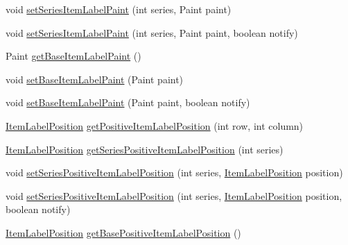 \begin{DoxyCompactItemize}
void \mbox{\hyperlink{classorg_1_1jfree_1_1chart_1_1renderer_1_1_abstract_renderer_a62672ca3063e22a4082f430571606ff0}{set\+Series\+Item\+Label\+Paint}} (int series, Paint paint)
\item 
void \mbox{\hyperlink{classorg_1_1jfree_1_1chart_1_1renderer_1_1_abstract_renderer_ab16a17533a8e7562ecfb1229c3191536}{set\+Series\+Item\+Label\+Paint}} (int series, Paint paint, boolean notify)
\item 
Paint \mbox{\hyperlink{classorg_1_1jfree_1_1chart_1_1renderer_1_1_abstract_renderer_a553eba1baf9f5d241c06a77c80a223d6}{get\+Base\+Item\+Label\+Paint}} ()
\item 
void \mbox{\hyperlink{classorg_1_1jfree_1_1chart_1_1renderer_1_1_abstract_renderer_a7f9efd901126d27a6f785a53e6872e04}{set\+Base\+Item\+Label\+Paint}} (Paint paint)
\item 
void \mbox{\hyperlink{classorg_1_1jfree_1_1chart_1_1renderer_1_1_abstract_renderer_a4d1aac1ee560b81daea409e8a28a4038}{set\+Base\+Item\+Label\+Paint}} (Paint paint, boolean notify)
\item 
\mbox{\hyperlink{classorg_1_1jfree_1_1chart_1_1labels_1_1_item_label_position}{Item\+Label\+Position}} \mbox{\hyperlink{classorg_1_1jfree_1_1chart_1_1renderer_1_1_abstract_renderer_a6737068cd9f275dae38acd6173a80708}{get\+Positive\+Item\+Label\+Position}} (int row, int column)
\item 
\mbox{\hyperlink{classorg_1_1jfree_1_1chart_1_1labels_1_1_item_label_position}{Item\+Label\+Position}} \mbox{\hyperlink{classorg_1_1jfree_1_1chart_1_1renderer_1_1_abstract_renderer_aeeec0341e079d624ac0a0984fbe83ceb}{get\+Series\+Positive\+Item\+Label\+Position}} (int series)
\item 
void \mbox{\hyperlink{classorg_1_1jfree_1_1chart_1_1renderer_1_1_abstract_renderer_afaf8ae06e544670e0ca1247dc965054b}{set\+Series\+Positive\+Item\+Label\+Position}} (int series, \mbox{\hyperlink{classorg_1_1jfree_1_1chart_1_1labels_1_1_item_label_position}{Item\+Label\+Position}} position)
\item 
void \mbox{\hyperlink{classorg_1_1jfree_1_1chart_1_1renderer_1_1_abstract_renderer_adee2d21993977ecf28eee1f4968bb222}{set\+Series\+Positive\+Item\+Label\+Position}} (int series, \mbox{\hyperlink{classorg_1_1jfree_1_1chart_1_1labels_1_1_item_label_position}{Item\+Label\+Position}} position, boolean notify)
\item 
\mbox{\hyperlink{classorg_1_1jfree_1_1chart_1_1labels_1_1_item_label_position}{Item\+Label\+Position}} \mbox{\hyperlink{classorg_1_1jfree_1_1chart_1_1renderer_1_1_abstract_renderer_ab6f209ffdfae7e859ba7c047f3160630}{get\+Base\+Positive\+Item\+Label\+Position}} ()

\end{DoxyCompactItemize}
